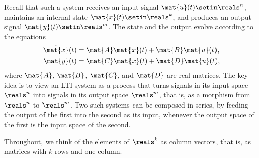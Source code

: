 Recall that such a system receives an input signal $\mat{u}(t) \setin \reals^n$, maintains an internal state $\mat{x}(t) \setin \reals^k$, and produces an output signal $\mat{y}(t) \setin \reals^m$.
The state and the output evolve according to the equations
\begin{equation}
    \label{eq:cat-dyn-lti-equations}
    \begin{aligned}
        \dot{\mat{x}}(t) & = \mat{A}\mat{x}(t) + \mat{B}\mat{u}(t), \\
        \mat{y}(t)       & = \mat{C}\mat{x}(t) + \mat{D}\mat{u}(t),
    \end{aligned}
\end{equation}
where $\mat{A}$, $\mat{B}$, $\mat{C}$, and $\mat{D}$ are real matrices.
The key idea is to view an LTI system as a process that turns signals in its input space $\reals^n$ into signals in its output space $\reals^m$, that is, as a morphism from $\reals^n$ to $\reals^m$.
Two such systems can be composed in series, by feeding the output of the first into the second as its input, whenever the output space of the first is the input space of the second.

Throughout, we think of the elements of $\reals^k$ as column vectors, that is, as matrices with $k$ rows and one column.


